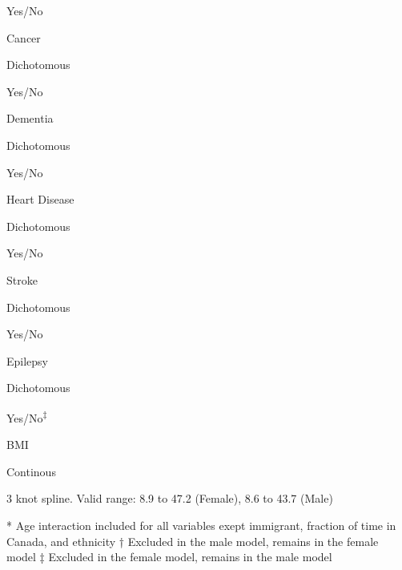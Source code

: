 \documentclass[]{book}
\begin{document}
Yes/No

Cancer

Dichotomous

Yes/No

Dementia

Dichotomous

Yes/No

Heart Disease

Dichotomous

Yes/No

Stroke

Dichotomous

Yes/No

Epilepsy

Dichotomous

Yes/No\textsuperscript{‡}

BMI

Continous

3 knot spline. Valid range: 8.9 to 47.2 (Female), 8.6 to 43.7 (Male)

* Age interaction included for all variables exept immigrant, fraction
of time in Canada, and ethnicity † Excluded in the male model, remains
in the female model ‡ Excluded in the female model, remains in the male
model


\end{document}
